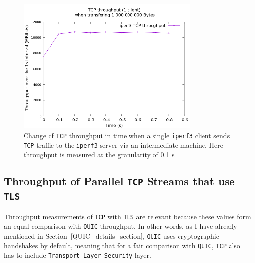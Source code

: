 \documentclass[12pt,a4paper]{report}
\newcommand\note[2]{{\color{#1}\bf #2}}
\newcommand\simon[1]{\ifcomments{\note{cyan}{SM: #1}}\fi}
\begin{document}
    \begin{figure}[ht]
    \centering
    \includegraphics[width=0.8\textwidth]{figs/TCP_throughput_in_time.png}
    \caption[Change of \texttt{TCP} throughput in time when a single \texttt{iperf3} client sends \texttt{TCP} traffic to the \texttt{iperf3} server via an intermediate machine]{Change of \texttt{TCP} throughput in time when a single \texttt{iperf3} client sends \texttt{TCP} traffic to the \texttt{iperf3} server via an intermediate machine. Here throughput is measured at the granularity of 0.1 s}
    \label{fig:TCP_throughput_in_time}
    \end{figure}
    
    
    
    
    

\subsection{Throughput of Parallel \texttt{TCP} Streams that use \texttt{TLS}}
 
Throughput measurements of \texttt{TCP} with \texttt{TLS} are relevant because these values form an equal comparison with \texttt{QUIC} throughput.
In other words, as I have already mentioned in Section~\ref{QUIC_details_section}, \texttt{QUIC} uses cryptographic handshakes by default, meaning that for a fair comparison with \texttt{QUIC}, \texttt{TCP} also has to include \texttt{Transport Layer Security} layer.
\end{document}
